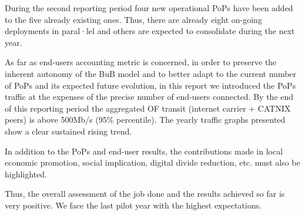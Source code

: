 During the second reporting period four new operational PoPs have been added to the five already existing ones. Thus, there are already eight on-going deployments in paral·lel and others are expected to consolidate during the next year.

As far as end-users accounting metric is concerned, in order to preserve the inherent autonomy of the BuB model and to better adapt to the current number of PoPs and its expected future evolution, in this report we introduced the PoPs traffic at the expenses of the precise number of end-users connected. By the end of this reporting period the aggregated OF transit (internet carrier + CATNIX peers) is above 500Mb/s (95\% percentile). The yearly traffic graphs presented show a clear sustained rising trend. 

In addition to the PoPs and end-user results, the contributions made in local economic promotion, social implication, digital divide reduction, etc. must also be highlighted.

Thus, the overall assessment of the job done and the results achieved so far is very positive. We face the last pilot year with the highest expectations.